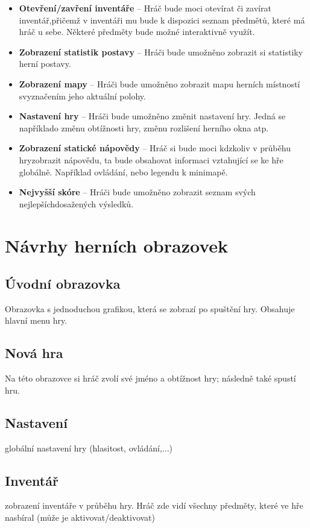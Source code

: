 \documentclass[12pt,a4paper]{article}
\begin{document}
\begin {itemize}
\item{\textbf{Otevření/zavření inventáře} --  Hráč bude moci otevírat či zavírat
  inventář,přičemž v inventáři mu bude k dispozici seznam předmětů, které má
  hráč u sebe.  Některé předměty bude možné interaktivně využít.}
\item{\textbf{Zobrazení statistik postavy} --  Hráči bude umožněno zobrazit si
  statistiky herní postavy.}
\item{\textbf{Zobrazení mapy} --  Hráči bude umožněno zobrazit mapu herních
  místností svyznačením jeho aktuální polohy.}
\item{\textbf{Nastavení hry} --  Hráči bude umožněno změnit nastavení hry. Jedná
  se napříklado změnu obtížnosti hry, změnu rozlišení herního okna atp.}
\item{\textbf{Zobrazení statické nápovědy} --  Hráč si bude moci kdzkoliv v
  průběhu hryzobrazit nápovědu, ta bude obsahovat informaci vztahující se ke hře
  globálně.  Například ovládání, nebo legendu k minimapě.}
\item{\textbf{Nejvyšší skóre} --  Hráči bude umožněno zobrazit seznam svých
  nejlepšíchdosažených výsledků.}
\end {itemize}




\section{Návrhy herních obrazovek}
\subsection{Úvodní obrazovka}
Obrazovka s jednoduchou grafikou, která se zobrazí po spuštění hry. Obsahuje hlavní menu hry.

\subsection{Nová hra} 
Na této obrazovce si hráč zvolí své jméno a obtížnost hry; následně také spustí
hru.

\subsection{Nastavení}
globální nastavení hry (hlasitost, ovládání,$\dots$)

\subsection{Inventář}
zobrazení inventáře v průběhu hry. Hráč zde vidí všechny předměty, které ve hře nasbíral (může je aktivovat/deaktivovat)
\end{document}
